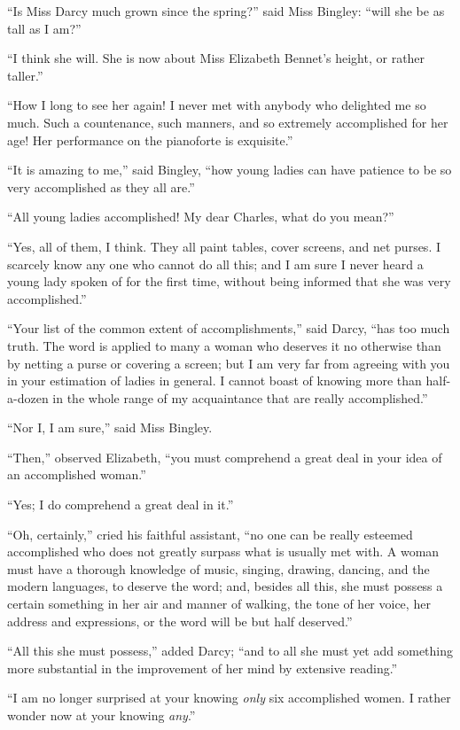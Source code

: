 \documentclass[12pt,openright]{book}
\begin{document}
“Is Miss Darcy much grown since the spring?” said Miss Bingley: “will she be as tall as I am?”

“I think she will. She is now about Miss Elizabeth Bennet’s height, or rather taller.”

“How I long to see her again! I never met with anybody who delighted me so much. Such a countenance, such manners, and so extremely accomplished for her age! Her performance on the pianoforte is exquisite.”

“It is amazing to me,” said Bingley, “how young ladies can have patience to be so very accomplished as they all are.”

“All young ladies accomplished! My dear Charles, what do you mean?”

“Yes, all of them, I think. They all paint tables, cover screens, and net purses. I scarcely know any one who cannot do all this; and I am sure I never heard a young lady spoken of for the first time, without being informed that she was very accomplished.”

“Your list of the common extent of accomplishments,” said Darcy, “has too much truth. The word is applied to many a woman who deserves it no otherwise than by netting a purse or covering a screen; but I am very far from agreeing with you in your estimation of ladies in general. I cannot boast of knowing more than half-a-dozen in the whole range of my acquaintance that are really accomplished.”

“Nor I, I am sure,” said Miss Bingley.

“Then,” observed Elizabeth, “you must comprehend a great deal in your idea of an accomplished woman.”

“Yes; I do comprehend a great deal in it.”

“Oh, certainly,” cried his faithful assistant, “no one can be really esteemed accomplished who does not greatly surpass what is usually met with. A woman must have a thorough knowledge of music, singing, drawing, dancing, and the modern languages, to deserve the word; and, besides all this, she must possess a certain something in her air and manner of walking, the tone of her voice, her address and expressions, or the word will be but half deserved.”

“All this she must possess,” added Darcy; “and to all she must yet add something more substantial in the improvement of her mind by extensive reading.”

“I am no longer surprised at your knowing \textit{only} six accomplished women. I rather wonder now at your knowing \textit{any}.”
\end{document}
